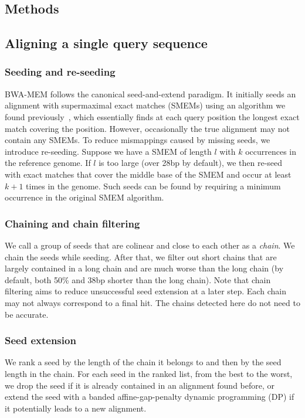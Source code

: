 \documentclass{bioinfo}
\begin{document}
\vspace*{-1em}
\begin{methods}

\section{Methods}

\subsection{Aligning a single query sequence}

\subsubsection{Seeding and re-seeding} BWA-MEM follows the canonical
seed-and-extend paradigm. It initially seeds an alignment with supermaximal
exact matches (SMEMs) using an algorithm we found previously~\citep[Algorithm
5]{Li:2012fk}, which essentially finds at each query position the longest exact
match covering the position. However, occasionally the true alignment may not
contain any SMEMs.  To reduce mismappings caused by missing seeds, we introduce
re-seeding. Suppose we have a SMEM of length $l$ with $k$ occurrences in the
reference genome. If $l$ is too large (over 28bp by default), we then re-seed
with exact matches that cover the middle base of the SMEM and occur at least
$k+1$ times in the genome. Such seeds can be found by requiring a minimum
occurrence in the original SMEM algorithm.

\subsubsection{Chaining and chain filtering} We call a group of seeds that are
colinear and close to each other as a \emph{chain}. We chain the seeds while
seeding. After that, we filter out short chains that are largely contained in a
long chain and are much worse than the long chain (by default, both 50\% and
38bp shorter than the long chain). Note that chain filtering aims to reduce
unsuccessful seed extension at a later step. Each chain may not always
correspond to a final hit. The chains detected here do not need to be accurate.

\subsubsection{Seed extension} We rank a seed by the length of the chain it
belongs to and then by the seed length in the chain. For each seed in the
ranked list, from the best to the worst, we drop the seed if it is already
contained in an alignment found before, or extend the seed with a banded
affine-gap-penalty dynamic programming (DP) if it potentially leads to a new
alignment.


\end{methods}
\end{document}
